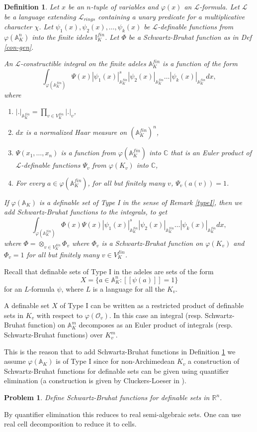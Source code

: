 \documentclass[12pt]{amsart}
\def\A{\mathbb{A}}
\def\I{\mathbb{I}}
\def\R{\mathbb{R}}
\def\C{\mathbb{C}}
\def\cL{\mathcal{L}}
\def\C{\mathbb{C}}
\def\R{\mathbb{R}}
\def\cL{\mathcal{L}}
\def\cO{\mathcal{O}}
\newtheorem{Def}{Definition}[section]
\numberwithin{equation}{section}
\newtheorem{prob}{Problem}[section]
\begin{document}
\begin{Def}\label{con-fin} Let $x$ be an $n$-tuple of variables and $\varphi(x)$ an $\cL$-formula. 
Let $\cL$ be a language extending $\cL_{rings}$ containing a unary predicate for a multiplicative character $\chi$. 
Let $\psi_1(x),\psi_2(x),\dots,\psi_k(x)$ be $\cL$-definable functions from $\varphi(\A_K^n)$ into the finite ideles $\I_K^{fin}$. Let $\Phi$ be a 
Schwartz-Bruhat function as in Def \ref{con-gen}.

An $\cL$-constructible integral on the finite adeles $\A_K^{fin}$ is a function of the form
$$\int_{\varphi(\A_K^{fin})}\Psi(x) |\psi_1(x)|_{\A_K^{fin}}^s |\psi_2(x)|_{\A_K^{fin}}\dots |\psi_k(x)|_{\A_K^{fin}} dx,$$
where
\begin{enumerate}
\item $|.|_{\A_K^{fin}}=\prod_{v\in V_K^{fin}} |.|_v$,
\item $dx$ is a normalized Haar measure on $(\A_K^{fin})^n$,
\item $\Psi(x_1,\dots,x_n)$ is a function from $\varphi(\A_K^{fin})$ into $\C$ that is an Euler product of $\cL$-definable
functions $\Psi_v$ from $\varphi(K_v)$ into $\C$,
\item For every $a\in \varphi(\A_K^{fin})$, for all but finitely many $v$, $\Psi_v(a(v))=1$.
\end{enumerate}
If $\varphi(\A_K)$ is a definable set of Type I in the sense of Remark \ref{typeI}, then we add Schwartz-Bruhat functions to the integrals, to get 
$$\int_{\varphi(\A_K^{fin})}\Phi(x) \Psi(x) |\psi_1(x)|_{\A_K^{fin}}^s |\psi_2(x)|_{\A_K^{fin}}\dots |\psi_k(x)|_{\A_K^{fin}} dx,$$
where $\Phi=\otimes_{v\in V_K^{fin}} \Phi_v$ where $\Phi_v$ is a Schwartz-Bruhat function on $\varphi(K_v)$ and $\Phi_v=1$ for all but finitely many $v\in V_K^{fin}$.
 \end{Def}
Recall that definable sets of Type I in the adeles are sets of the form 
$$X=\{a\in \A_K^n: [[\psi(a)]]=1\}$$ for an $L$-formula $\psi$, where $L$ is a language for all the $K_v$. 

A definable set $X$ of Type I can be written as a restricted product of definable sets in $K_v$ with respect to $\varphi(\cO_v)$. In this case an integral (resp. Schwartz-Bruhat function) on $\A_K^m$  
decomposes as an Euler product of integrals (resp. Schwartz-Bruhat functions) over $K_v^m$. 

This is the reason that to add Schwartz-Bruhat functions in Definition \ref{con-fin} we assume $\varphi(\A_K)$ is of Type I 
since for non-Archimedean $K_v$ a construction of Schwartz-Bruhat functions for definable sets can be given using quantifier elimination (a construction is given by Cluckers-Loeser in \cite{CL2}).
\begin{prob}\label{real-sb} Define Schwartz-Bruhat functions for definable sets in $\R^n$.\end{prob} 
By quantifier elimination this reduces to real semi-algebraic sets. One can use real cell decomposition to reduce it to cells.
\end{document}
